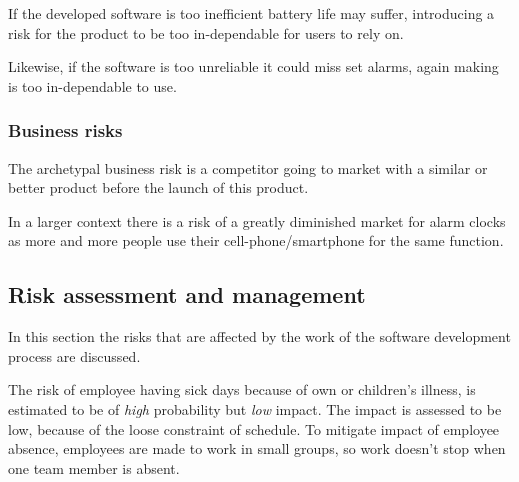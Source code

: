 \documentclass[Main]{subfiles}
\begin{document}
		If the developed software is too inefficient battery life may suffer, introducing a risk for the product to be too in-dependable for users to rely on.

		Likewise, if the software is too unreliable it could miss set alarms, 
		again making is too in-dependable to use.



		\subsubsection{Business risks} %
		\label{sub:business_risks}

		The archetypal business risk is a competitor going to market with a similar or better product before the launch of this product.

		In a larger context there is a risk of a greatly diminished market for alarm clocks as more and more people use their cell-phone/smartphone for the same function.






	\subsection{Risk assessment and management} %
	\label{sub:risk_assessment_and_management}

	In this section the risks that are affected by the work of the software development process are discussed.

	The risk of employee having sick days because of own or children's illness, is estimated to be of \emph{high} probability but \emph{low} impact.
	The impact is assessed to be low, because of the loose constraint of schedule.
	To mitigate impact of employee absence, employees are made to work in small groups, so work doesn't stop when one team member is absent.
\end{document}
